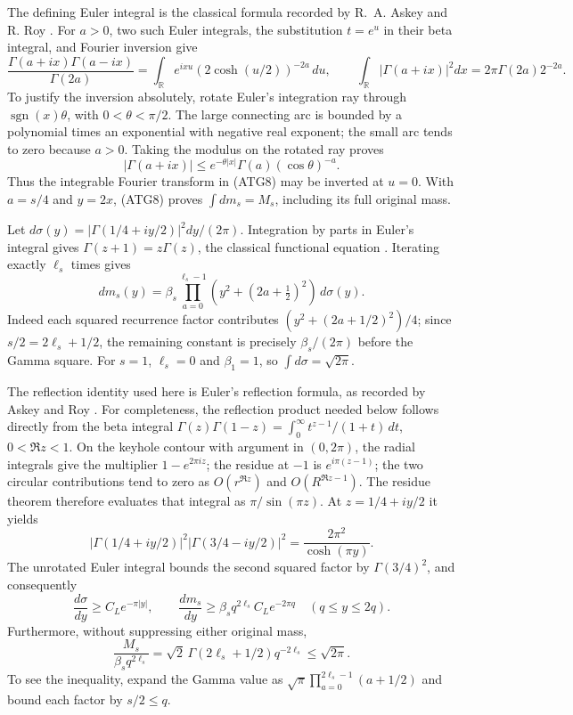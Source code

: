 The defining Euler integral is the classical formula recorded by
R.~A. Askey and R. Roy \cite[eq.~(5.2.1)]{human:dlmf5}.
For $a>0$, two such Euler integrals, the substitution $t=e^u$ in their
beta integral, and Fourier inversion give
\[
 \frac{\Gamma(a+ix)\Gamma(a-ix)}{\Gamma(2a)}
 =\int_{\mathbb R}e^{ixu}(2\cosh(u/2))^{-2a}\,du,
 \qquad
 \int_{\mathbb R}|\Gamma(a+ix)|^2dx
 =2\pi\Gamma(2a)2^{-2a}.
\tag{ATG8}
\]
To justify the inversion absolutely, rotate Euler's integration ray
through $\operatorname{sgn}(x)\theta$, with $0<\theta<\pi/2$.
The large connecting arc is bounded by a polynomial times an
exponential with negative real exponent; the small arc tends to zero
because $a>0$. Taking the modulus on the rotated ray proves
\[
 |\Gamma(a+ix)|\le e^{-\theta|x|}\Gamma(a)(\cos\theta)^{-a}.
\tag{ATG9}
\]
Thus the integrable Fourier transform in (ATG8) may be inverted at
$u=0$. With $a=s/4$ and $y=2x$, (ATG8) proves
$\int dm_s=M_s$, including its full original mass.

Let
$d\sigma(y)=|\Gamma(1/4+iy/2)|^2dy/(2\pi)$.
Integration by parts in Euler's integral gives
$\Gamma(z+1)=z\Gamma(z)$, the classical functional equation
\cite[eq.~(5.5.1)]{human:dlmf5}. Iterating exactly $\ell_s$ times gives
\[
 dm_s(y)=\beta_s\prod_{a=0}^{\ell_s-1}
                (y^2+(2a+\tfrac12)^2)\,d\sigma(y).
\tag{ATG10}
\]
Indeed each squared recurrence factor contributes
$(y^2+(2a+1/2)^2)/4$; since $s/2=2\ell_s+1/2$, the remaining
constant is precisely $\beta_s/(2\pi)$ before the Gamma square.
For $s=1$, $\ell_s=0$ and $\beta_1=1$, so
$\int d\sigma=\sqrt{2\pi}$.

The reflection identity used here is Euler's reflection formula,
as recorded by Askey and Roy \cite[eq.~(5.5.3)]{human:dlmf5}.
For completeness, the reflection product needed below follows
directly from the beta integral
$\Gamma(z)\Gamma(1-z)=\int_0^\infty t^{z-1}/(1+t)\,dt$,
$0<\Re z<1$. On the keyhole contour with argument in $(0,2\pi)$,
the radial integrals give the multiplier $1-e^{2\pi iz}$; the
residue at $-1$ is $e^{i\pi(z-1)}$; the two circular contributions
tend to zero as $O(r^{\Re z})$ and $O(R^{\Re z-1})$.
The residue theorem therefore evaluates that integral as
$\pi/\sin(\pi z)$. At $z=1/4+iy/2$ it yields
\[
 |\Gamma(1/4+iy/2)|^2|\Gamma(3/4-iy/2)|^2
       =\frac{2\pi^2}{\cosh(\pi y)}.
\tag{ATG11}
\]
The unrotated Euler integral bounds the second squared factor by
$\Gamma(3/4)^2$, and consequently
\[
 \frac{d\sigma}{dy}\ge C_Le^{-\pi|y|},\qquad
 \frac{dm_s}{dy}\ge\beta_s q^{2\ell_s}C_Le^{-2\pi q}
                 \quad(q\le y\le2q).
\tag{ATG12}
\]
Furthermore, without suppressing either original mass,
\[
 \frac{M_s}{\beta_s q^{2\ell_s}}
 =\sqrt2\,\Gamma(2\ell_s+1/2)q^{-2\ell_s}
 \le\sqrt{2\pi}.
\tag{ATG13}
\]
To see the inequality, expand the Gamma value as
$\sqrt\pi\prod_{a=0}^{2\ell_s-1}(a+1/2)$ and bound each factor
by $s/2\le q$.

